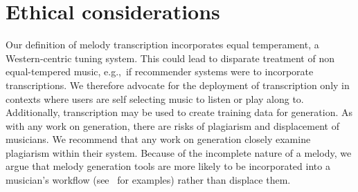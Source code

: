 \section{Ethical considerations}

Our definition of melody transcription incorporates equal temperament, a Western-centric tuning system. 
This could lead to disparate treatment of non equal-tempered music, e.g.,~if recommender systems were to incorporate transcriptions.
We therefore advocate for the deployment of transcription only in contexts where users are self selecting music to listen or play along to. 
Additionally, transcription may be used to create training data for generation. 
As with any work on generation, there are risks of plagiarism and displacement of musicians. 
We recommend that any work on generation closely examine plagiarism within their system. 
Because of the incomplete nature of a melody, we argue that melody generation tools are more likely to be incorporated into a musician's workflow (see~\cite{huang2020ai} for examples) rather than displace them.